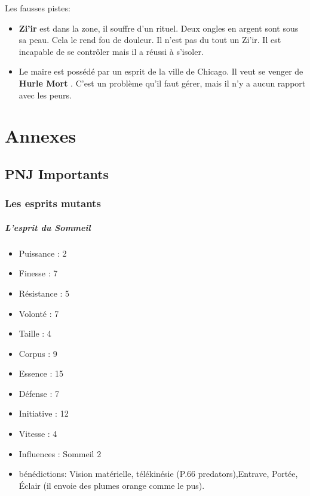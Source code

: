 \documentclass[oneside,12pt]{book}
\newcommand{\Peter}{\textbf{Hurle Mort} }
\newcommand{\Thomas}{\textbf{Zi'ir} }
\begin{document}
\begin{flushleft}
Les fausses pistes:
\begin{itemize}
\item \Thomas est dans la zone, il souffre d'un rituel. Deux ongles en argent sont sous sa peau. 
Cela le rend fou de douleur. Il n'est pas du tout un Zi'ir. Il est incapable de se contrôler mais il a réussi à 
s'isoler. 
\item Le maire est possédé par un esprit de la ville de Chicago. Il veut se venger de \Peter. C'est un problème qu'il faut gérer, mais il n'y a aucun rapport avec les peurs.
\end{itemize}

\chapter{Annexes}
\section{PNJ Importants}
\subsection{Les esprits mutants}
\label{esprit_mutant}
\paragraph{L'esprit du Sommeil}
\begin{itemize}
\item Puissance : 2
\item Finesse : 7
\item Résistance : 5
\item Volonté : 7
\item Taille : 4
\item Corpus : 9
\item Essence : 15
\item Défense : 7
\item Initiative : 12
\item Vitesse : 4
\item Influences : Sommeil 2
\item bénédictions: Vision matérielle, télékinésie (P.66 predators),Entrave, Portée, Éclair (il envoie des plumes orange comme le pus). 
\end{itemize}


\end{flushleft}
\end{document}
